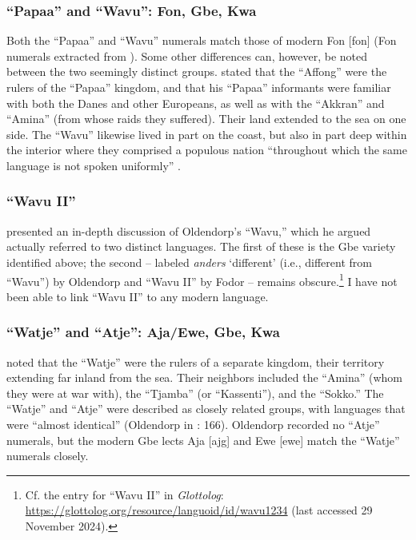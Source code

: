 \documentclass[output=paper,colorlinks,citecolor=brown]{langscibook}
\begin{document}
\subsubsection{``Papaa'' and ``Wavu'': Fon, Gbe, Kwa}

Both the ``Papaa'' and ``Wavu'' numerals match those of modern Fon [fon] (Fon numerals extracted from \cite{Lefebvre_Brousseau_2002}). Some other differences can, however, be noted between the two seemingly distinct groups. \citet[411--412]{Oldendorp_2000} stated that the ``Affong'' were the rulers of the ``Papaa'' kingdom, and that his ``Papaa'' informants were familiar with both the Danes and other Europeans, as well as with the ``Akkran'' and ``Amina'' (from whose raids they suffered). Their land extended to the sea on one side. The ``Wavu'' likewise lived in part on the coast, but also in part deep within the interior where they comprised a populous nation ``throughout which the same language is not spoken uniformly'' \citep[166]{Highfield_1987}.

\subsubsection{``Wavu II''}

\citet[132--137]{Fodor_1975} presented an in-depth discussion of Oldendorp's ``Wavu,'' which he argued actually referred to two distinct languages. The first of these is the Gbe variety identified above; the second – labeled \emph{anders} `different' (i.e., different from ``Wavu'') by Oldendorp and ``Wavu II'' by Fodor – remains obscure.\footnote{Cf. the entry for ``Wavu II'' in \emph{Glottolog}: \url{https://glottolog.org/resource/languoid/id/wavu1234} (last accessed 29 November 2024).} I have not been able to link ``Wavu II'' to any modern language.

\subsubsection{``Watje'' and ``Atje'': Aja/Ewe, Gbe, Kwa}

\citet[413, 419]{Oldendorp_2000} noted that the “Watje” were the rulers of a separate kingdom, their territory extending far inland from the sea. Their neighbors included the “Amina” (whom they were at war with), the “Tjamba” (or “Kassenti”), and the “Sokko.” The “Watje” and “Atje” were described as closely related groups, with languages that were “almost identical” (Oldendorp in \cite{Highfield_1987}: 166). Oldendorp recorded no “Atje” numerals, but the modern Gbe lects Aja [ajg] and Ewe [ewe] match the “Watje” numerals closely.
\end{document}
